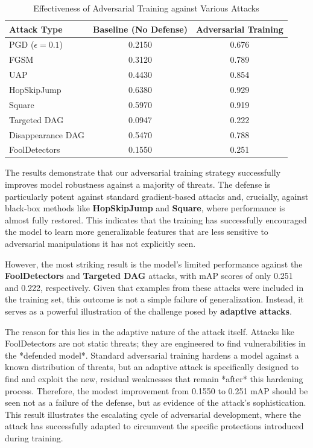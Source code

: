 \documentclass[../main.tex]{subfiles}
\begin{document}
\begin{table}[h!]
    \centering
    \caption{Effectiveness of Adversarial Training against Various Attacks}
    \label{tab:at_results}
    \begin{tabular}{l S[table-format=1.4] S[table-format=1.3]}
        \toprule
        \textbf{Attack Type} & {\textbf{Baseline (No Defense)}} & {\textbf{Adversarial Training}} \\
        \midrule
        PGD ($\epsilon=0.1$) & 0.2150 & 0.676 \\
        FGSM                 & 0.3120 & 0.789 \\
        UAP                  & 0.4430 & 0.854 \\
        HopSkipJump          & 0.6380 & 0.929 \\
        Square               & 0.5970 & 0.919 \\
        Targeted DAG         & 0.0947 & 0.222 \\
        Disappearance DAG    & 0.5470 & 0.788 \\
        FoolDetectors        & 0.1550 & 0.251 \\
        \bottomrule
    \end{tabular}
\end{table}

The results demonstrate that our adversarial training strategy successfully improves model robustness against a majority of threats. The defense is particularly potent against standard gradient-based attacks and, crucially, against black-box methods like \textbf{HopSkipJump} and \textbf{Square}, where performance is almost fully restored. This indicates that the training has successfully encouraged the model to learn more generalizable features that are less sensitive to adversarial manipulations it has not explicitly seen.

However, the most striking result is the model's limited performance against the \textbf{FoolDetectors} and \textbf{Targeted DAG} attacks, with mAP scores of only 0.251 and 0.222, respectively. Given that examples from these attacks were included in the training set, this outcome is not a simple failure of generalization. Instead, it serves as a powerful illustration of the challenge posed by \textbf{adaptive attacks}.

The reason for this lies in the adaptive nature of the attack itself. Attacks like FoolDetectors are not static threats; they are engineered to find vulnerabilities in the *defended model*. Standard adversarial training hardens a model against a known distribution of threats, but an adaptive attack is specifically designed to find and exploit the new, residual weaknesses that remain *after* this hardening process. Therefore, the modest improvement from 0.1550 to 0.251 mAP should be seen not as a failure of the defense, but as evidence of the attack's sophistication. This result illustrates the escalating cycle of adversarial development, where the attack has successfully adapted to circumvent the specific protections introduced during training.
\end{document}
